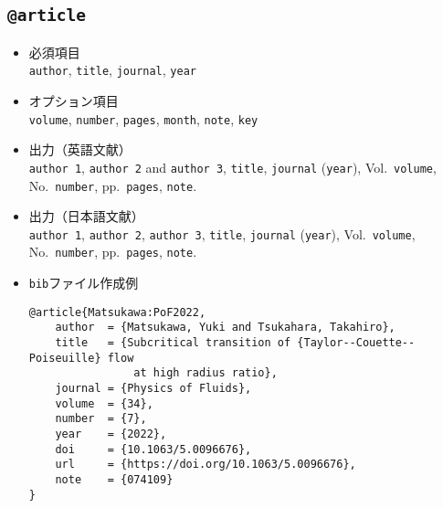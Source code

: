 \documentclass[a4paper,fleqn,uplatex,dvipdfmx]{jsarticle}
\makeatletter
\newcommand{\ttarticle}{\texttt{@article}}
\makeatother
\begin{document}
\subsection{\ttarticle}
\label{ssec:article}
\begin{screen}
    \begin{itemize}
        \item 必須項目 \\
        \verb|author|, \verb|title|, \verb|journal|, \verb|year|
        \item オプション項目 \\
        \verb|volume|, \verb|number|, \verb|pages|, \verb|month|, \verb|note|, \verb|key|
        \item 出力（英語文献） \\
            \colorbox[gray]{0.8}{\texttt{author 1}}, \colorbox[gray]{0.8}{\texttt{author 2}} and \colorbox[gray]{0.8}{\texttt{author 3}}, \colorbox[gray]{0.8}{\texttt{title}}, \colorbox[gray]{0.8}{\texttt{journal}} (\colorbox[gray]{0.8}{\texttt{year}}), Vol.~\colorbox[gray]{0.8}{\texttt{volume}}, No.~\colorbox[gray]{0.8}{\texttt{number}}, pp.~\colorbox[gray]{0.8}{\texttt{pages}}, \colorbox[gray]{0.8}{\texttt{note}}.
        \item 出力（日本語文献） \\
            \colorbox[gray]{0.8}{\texttt{author 1}}, \colorbox[gray]{0.8}{\texttt{author 2}}, \colorbox[gray]{0.8}{\texttt{author 3}}, \colorbox[gray]{0.8}{\texttt{title}}, \colorbox[gray]{0.8}{\texttt{journal}} (\colorbox[gray]{0.8}{\texttt{year}}), Vol.~\colorbox[gray]{0.8}{\texttt{volume}}, No.~\colorbox[gray]{0.8}{\texttt{number}}, pp.~\colorbox[gray]{0.8}{\texttt{pages}}, \colorbox[gray]{0.8}{\texttt{note}}.
        \item \verb|bib|ファイル作成例 \vspace{-3mm}
\begin{verbatim}
@article{Matsukawa:PoF2022,
    author  = {Matsukawa, Yuki and Tsukahara, Takahiro},
    title   = {Subcritical transition of {Taylor--Couette--Poiseuille} flow 
                at high radius ratio},
    journal = {Physics of Fluids},
    volume  = {34},
    number  = {7},
    year    = {2022},
    doi     = {10.1063/5.0096676},
    url     = {https://doi.org/10.1063/5.0096676},
    note    = {074109}
}
\end{verbatim}
    \end{itemize}
\end{screen}
\end{document}
